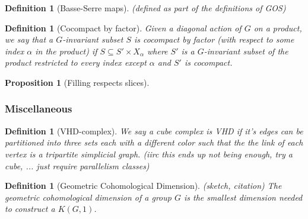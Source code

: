 \documentclass{article}
\theoremstyle{mystyle}
\newtheorem{pro}[thm]{Proposition}
\newtheorem{defn}[thm]{Definition}
\theoremstyle{remark}
\begin{document}
\begin{defn}
    [Basse-Serre maps]
    \label{defn:basseserremaps}
    (defined as part of the definitions of GOS)
\end{defn}

\begin{defn}
    [Cocompact by factor]
    \label{defn:cocompactcrossfactor} 
    Given a diagonal action of \(G\) on a product, we say that a \(G\)-invariant subset \(S\) is cocompact by factor (with respect to some index \(\alpha\) in the product) if \(S \subseteq  S' \times X_{\alpha}\) where \(S'\) is a \(G\)-invariant subset of the product restricted to every index except \(\alpha\) and \(S'\) is cocompact.
\end{defn}

\begin{pro}
    [Filling respects slices]
    \label{pro:fillingrespectsslices} 
\end{pro}



\subsubsection{Miscellaneous}

\begin{defn}
    [VHD-complex]
    \label{defn:vhd} 
    We say a cube complex is VHD if it's edges can be partitioned into three sets each with a different color such that the the link of each vertex is a tripartite simplicial graph. (iirc this ends up not being enough, try a cube, ... just require parallelism classes)
\end{defn}

\begin{defn}
    [Geometric Cohomological Dimension]
    (sketch, citation)
    The geometric cohomological dimension of a group $G$ is the smallest dimension needed to construct a $K(G,1)$.
\end{defn}
\end{document}
